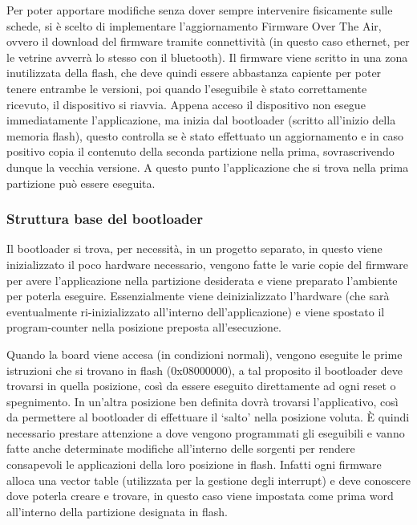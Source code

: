 Per poter apportare modifiche senza dover sempre intervenire fisicamente sulle schede, si \`e scelto di implementare l'aggiornamento Firmware Over The Air, ovvero il download del firmware tramite connettivit\`a (in questo caso ethernet, per le vetrine avverr\`a lo stesso con il bluetooth). Il firmware viene scritto in una zona inutilizzata della flash, che deve quindi essere abbastanza capiente per poter tenere entrambe le versioni, poi quando l'eseguibile \`e stato correttamente ricevuto, il dispositivo si riavvia. Appena acceso il dispositivo non esegue immediatamente l'applicazione, ma inizia dal bootloader (scritto all'inizio della memoria flash), questo controlla se \`e stato effettuato un aggiornamento e in caso positivo copia il contenuto della seconda partizione nella prima, sovrascrivendo dunque la vecchia versione. A questo punto l'applicazione che si trova nella prima partizione pu\`o essere eseguita.

\subsubsection{Struttura base del bootloader}

Il bootloader si trova, per necessit\`a, in un progetto separato, in questo viene inizializzato il poco hardware necessario, vengono fatte le varie copie del firmware per avere l'applicazione nella partizione desiderata e viene preparato l'ambiente per poterla eseguire. Essenzialmente viene deinizializzato l'hardware (che sar\`a eventualmente ri-inizializzato all'interno dell'applicazione) e viene spostato il program-counter nella posizione preposta all'esecuzione.

Quando la board viene accesa (in condizioni normali), vengono eseguite le prime istruzioni che si trovano in flash (0x08000000), a tal proposito il bootloader deve trovarsi in quella posizione, cos\`i da essere eseguito direttamente ad ogni reset o spegnimento. In un'altra posizione ben definita dovr\`a trovarsi l'applicativo, cos\`i da permettere al bootloader di effettuare il `salto' nella posizione voluta. \`E quindi necessario prestare attenzione a dove vengono programmati gli eseguibili e vanno fatte anche determinate modifiche all'interno delle sorgenti per rendere consapevoli le applicazioni della loro posizione in flash. Infatti ogni firmware alloca una vector table (utilizzata per la gestione degli interrupt) e deve conoscere dove poterla creare e trovare, in questo caso viene impostata come prima word all'interno della partizione designata in flash.

